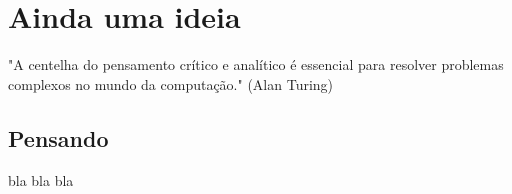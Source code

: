 \chapter{Ainda uma ideia}

\begin{remark}
"A centelha do pensamento crítico e analítico é essencial para resolver problemas complexos no mundo da computação." (Alan Turing) 
\end{remark}

\section{Pensando}
bla bla bla

\clearpage